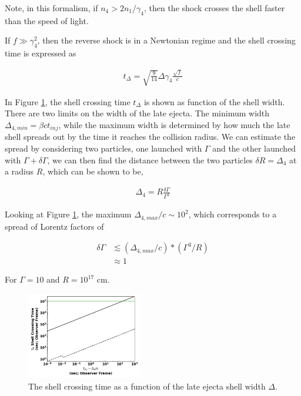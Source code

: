 \documentclass[linenumbers,twocolumn]{aastex631}
\begin{document}
{    Note, in this formalism, if $n_4> 2 n_1 / \gamma_4$, then the shock crosses the shell faster than the speed of light. 

    If $f\gg\gamma_4^2$, then the reverse shock is in a Newtonian regime and the shell crossing time is expressed as

    \begin{align}
        t_{\Delta} = \sqrt{\frac{9}{14}}\Delta\gamma_4\frac{\sqrt{f}}{c}
    \end{align}

    In Figure \ref{fig: shell cross time}, the shell crossing time $t_{\Delta}$ is shown as function of the shell width. There are two limits on the width of the late ejecta. The minimum width $\Delta_{4,min} = \beta c t_{inj}$, while the maximum width is determined by how much the late shell spreads out by the time it reaches the collision radius. We can estimate the spread by considering two particles, one launched with $\Gamma$ and the other launched with $\Gamma + \delta\Gamma$, we can then find the distance between the two particles $\delta R = \Delta_4$ at a radius $R$, which can be shown to be, 

    \begin{align}
        \Delta_4 = R \frac{\delta \Gamma}{\Gamma^3}
    \end{align}

    Looking at Figure \ref{fig: shell cross time}, the maximum $\Delta_{4,max}/c \sim 10^2$, which corresponds to a spread of Lorentz factors of 

    \begin{align}
        \delta \Gamma &\lesssim (\Delta_{4,max}/c) * (\Gamma^3 / R)\\
        &\approx 1 
    \end{align}

    For $\Gamma = 10$ and $R = 10^{17}$ cm.


    \begin{figure}[t!]
        \centering
        \includegraphics[width=0.45\textwidth]{shell-width-vs-cross-time.png}
        \caption{The shell crossing time as a function of the late ejecta shell width $\Delta$.}
        \label{fig: shell cross time}
    \end{figure}

}
\end{document}
